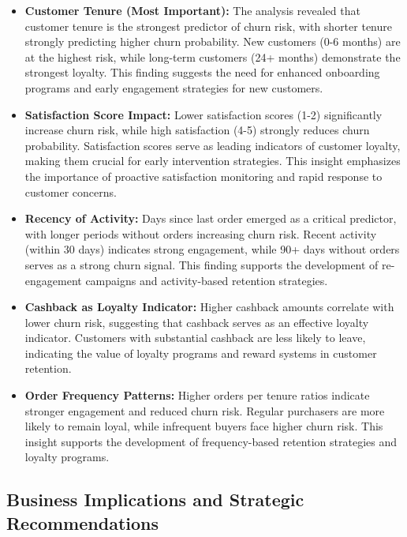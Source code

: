 \documentclass{article}
\begin{document}
\begin{itemize}
    \item \textbf{Customer Tenure (Most Important):} The analysis revealed that customer tenure is the strongest predictor of churn risk, with shorter tenure strongly predicting higher churn probability. New customers (0-6 months) are at the highest risk, while long-term customers (24+ months) demonstrate the strongest loyalty. This finding suggests the need for enhanced onboarding programs and early engagement strategies for new customers.
    
    \item \textbf{Satisfaction Score Impact:} Lower satisfaction scores (1-2) significantly increase churn risk, while high satisfaction (4-5) strongly reduces churn probability. Satisfaction scores serve as leading indicators of customer loyalty, making them crucial for early intervention strategies. This insight emphasizes the importance of proactive satisfaction monitoring and rapid response to customer concerns.
    
    \item \textbf{Recency of Activity:} Days since last order emerged as a critical predictor, with longer periods without orders increasing churn risk. Recent activity (within 30 days) indicates strong engagement, while 90+ days without orders serves as a strong churn signal. This finding supports the development of re-engagement campaigns and activity-based retention strategies.
    
    \item \textbf{Cashback as Loyalty Indicator:} Higher cashback amounts correlate with lower churn risk, suggesting that cashback serves as an effective loyalty indicator. Customers with substantial cashback are less likely to leave, indicating the value of loyalty programs and reward systems in customer retention.
    
    \item \textbf{Order Frequency Patterns:} Higher orders per tenure ratios indicate stronger engagement and reduced churn risk. Regular purchasers are more likely to remain loyal, while infrequent buyers face higher churn risk. This insight supports the development of frequency-based retention strategies and loyalty programs.
\end{itemize}

\subsection{Business Implications and Strategic Recommendations}
\end{document}
